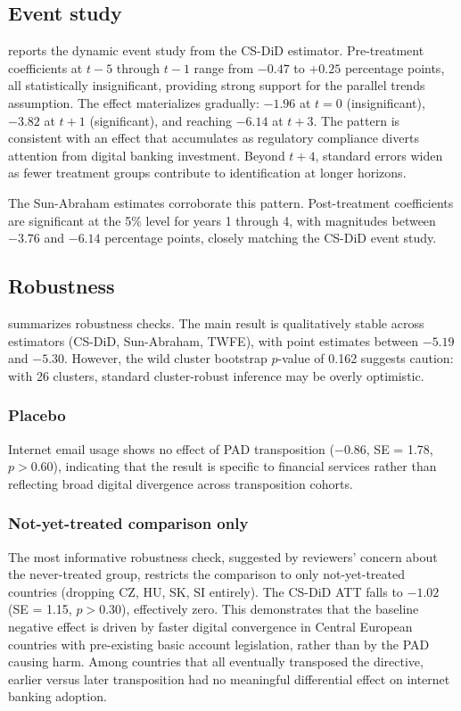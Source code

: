 \documentclass[12pt]{article}
\begin{document}
\subsection{Event study}

 reports the dynamic event study from the CS-DiD estimator. Pre-treatment coefficients at $t-5$ through $t-1$ range from $-0.47$ to $+0.25$ percentage points, all statistically insignificant, providing strong support for the parallel trends assumption. The effect materializes gradually: $-1.96$ at $t = 0$ (insignificant), $-3.82$ at $t+1$ (significant), and reaching $-6.14$ at $t+3$. The pattern is consistent with an effect that accumulates as regulatory compliance diverts attention from digital banking investment. Beyond $t+4$, standard errors widen as fewer treatment groups contribute to identification at longer horizons.



The Sun-Abraham estimates corroborate this pattern. Post-treatment coefficients are significant at the 5\% level for years 1 through 4, with magnitudes between $-3.76$ and $-6.14$ percentage points, closely matching the CS-DiD event study.

\subsection{Robustness}

 summarizes robustness checks. The main result is qualitatively stable across estimators (CS-DiD, Sun-Abraham, TWFE), with point estimates between $-5.19$ and $-5.30$. However, the wild cluster bootstrap $p$-value of 0.162 suggests caution: with 26 clusters, standard cluster-robust inference may be overly optimistic.



\subsubsection*{Placebo} Internet email usage shows no effect of PAD transposition ($-0.86$, SE = 1.78, $p > 0.60$), indicating that the result is specific to financial services rather than reflecting broad digital divergence across transposition cohorts.

\subsubsection*{Not-yet-treated comparison only} The most informative robustness check, suggested by reviewers' concern about the never-treated group, restricts the comparison to only not-yet-treated countries (dropping CZ, HU, SK, SI entirely). The CS-DiD ATT falls to $-1.02$ (SE = 1.15, $p > 0.30$), effectively zero. This demonstrates that the baseline negative effect is driven by faster digital convergence in Central European countries with pre-existing basic account legislation, rather than by the PAD causing harm. Among countries that all eventually transposed the directive, earlier versus later transposition had no meaningful differential effect on internet banking adoption.
\end{document}
